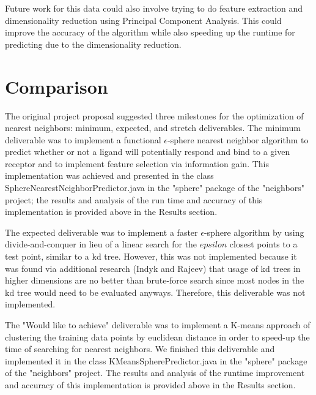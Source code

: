 \documentclass[11pt,letterpaper]{article}
\begin{document}
Future work for this data could also involve trying to do feature extraction and dimensionality reduction using Principal Component Analysis.  This could improve the accuracy of the algorithm while also speeding up the runtime for predicting due to the dimensionality reduction.  

\section{Comparison}

The original project proposal suggested three milestones for the optimization of nearest neighbors: minimum, expected, and stretch deliverables. The minimum deliverable was to implement a functional $\epsilon$-sphere nearest neighbor algorithm to predict whether or not a ligand will potentially respond and bind to a given receptor and to implement feature selection via information gain. This implementation was achieved and presented in the class SphereNearestNeighborPredictor.java in the "sphere" package of the "neighbors" project; the results and analysis of the run time and accuracy of this implementation is provided above in the Results section.

The expected deliverable was to implement a faster $\epsilon$-sphere algorithm by using divide-and-conquer in lieu of a linear search for the $epsilon$ closest points to a test point, similar to a kd tree. However, this was not implemented because it was found via additional research (Indyk and Rajeev) that usage of kd trees in higher dimensions are no better than brute-force search since most nodes in the kd tree would need to be evaluated anyways. Therefore, this deliverable was not implemented.

The "Would like to achieve" deliverable was to implement a K-means approach of clustering the training data points by euclidean distance in order to speed-up the time of searching for nearest neighbors.  We finished this deliverable and implemented it in the class KMeansSpherePredictor.java in the "sphere" package of the "neighbors" project. The results and analysis of the runtime improvement and accuracy of this implementation is provided above in the Results section.
\end{document}
